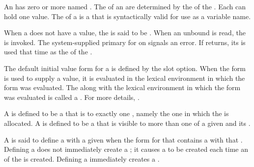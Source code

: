 
                    
An   has zero or more named
.  The  of an  are determined 
by the  of the .  Each  can hold
one value.
The  of a  is a  that is syntactically
valid for use as a variable name.

When a  does not have a value, the  is said to be 
.  When an unbound  is read,
the   is invoked. The 
system-supplied primary  
for  
on   signals an error.
If  returns, its  
is used that time as the  of the .

The default initial value form for a  is defined by
the  slot option.  When the  form is used to
supply a value, it is evaluated in the lexical environment in which
the  form was evaluated. The  along with
the lexical environment in which the  form was evaluated
is called a . 
For more details, \seesection\ObjectCreationAndInit.
             
A  is defined to be a  that is
to exactly one , 
namely the one in which the  is allocated.  
A  is defined to be a  that is visible to more than one
 of a given  and its .

A  is said to define a  with a given  when
the  form for that  contains a  with
that .  Defining a  does not immediately create 
a ; it causes a  to be created each time 
an  of the  is created.
Defining a  immediately creates a .
                                                    
